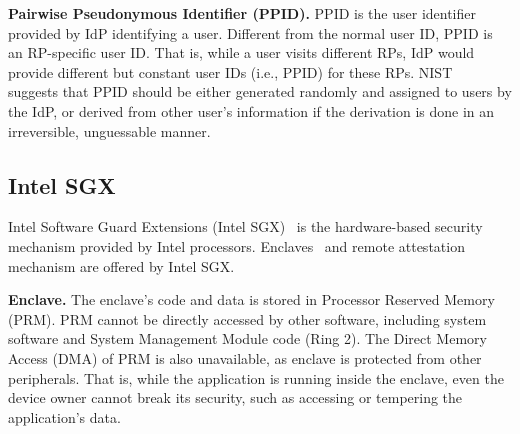 \vspace{1mm}\noindent\textbf{Pairwise Pseudonymous Identifier (PPID).}
PPID is the user identifier provided by IdP identifying a user. Different from the normal user ID, PPID is an RP-specific user ID. That is, while a user visits different RPs, IdP would provide different but constant user IDs (i.e., PPID) for these RPs.
NIST~\cite{NIST2017draft} suggests that PPID should be either generated randomly and assigned to users by the IdP, or derived from other user's information if the derivation is done in an irreversible, unguessable manner.


\subsection{Intel SGX}
Intel Software Guard Extensions (Intel SGX)~\cite{costan2016intel} is the hardware-based security  mechanism provided by Intel processors.  Enclaves~\cite{costan2016intel} and remote attestation~\cite{costan2016intel} mechanism are offered by Intel SGX.

\vspace{1mm}\noindent\textbf{Enclave.}
The enclave’s code and data is stored in Processor Reserved Memory (PRM).
PRM cannot be directly accessed by other software, including system software and System Management Module code (Ring 2).
The Direct Memory Access (DMA) of PRM is also unavailable, as enclave is protected from other peripherals. That is, while the application is running inside the enclave, even the device owner cannot break its security, such as accessing or tempering the application's data.



